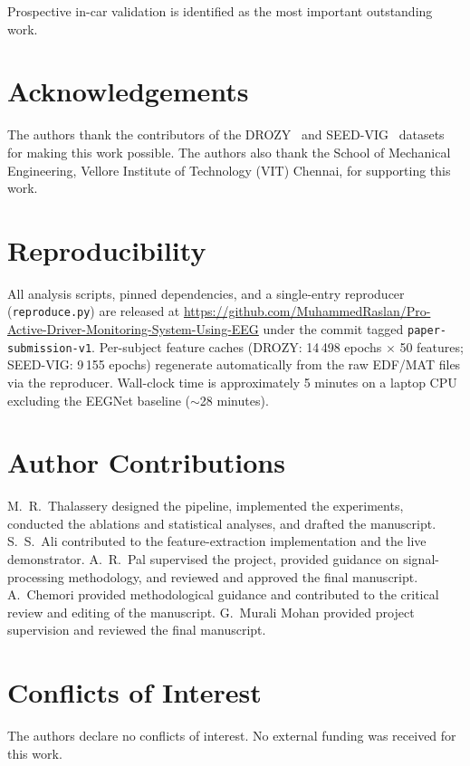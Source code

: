\documentclass[journal]{IEEEtran}
\DeclareRobustCommand{\add}[1]{#1}                         %
\DeclareRobustCommand{\add}[1]{\hl{#1}}
\begin{document}
Prospective in-car validation is identified as the most important outstanding work.

\section*{Acknowledgements}
The authors thank the contributors of the DROZY~\cite{drozy2016} and SEED-VIG~\cite{zheng2017seedvig} datasets for making this work possible. \add{The authors also thank the School of Mechanical Engineering, Vellore Institute of Technology (VIT) Chennai, for supporting this work.}

\section*{Reproducibility}
All analysis scripts, pinned dependencies, and a single-entry reproducer (\texttt{reproduce.py}) are released at \url{https://github.com/MuhammedRaslan/Pro-Active-Driver-Monitoring-System-Using-EEG} under the commit tagged \texttt{paper-submission-v1}. Per-subject feature caches (DROZY: 14\,498 epochs \(\times\) 50 features; SEED-VIG: 9\,155 epochs) regenerate automatically from the raw EDF/MAT files via the reproducer. Wall-clock time is approximately 5 minutes on a laptop CPU excluding the EEGNet baseline (\(\sim\)28 minutes).

\section*{Author Contributions}
M.~R.~Thalassery designed the pipeline, implemented the experiments, conducted the ablations and statistical analyses, and drafted the manuscript. S.~S.~Ali contributed to the feature-extraction implementation and the live demonstrator. A.~R.~Pal supervised the project, provided guidance on signal-processing methodology, and reviewed and approved the final manuscript. \add{A.~Chemori provided methodological guidance and contributed to the critical review and editing of the manuscript.} G.~Murali Mohan provided project supervision and reviewed the final manuscript.

\section*{Conflicts of Interest}
The authors declare no conflicts of interest. No external funding was received for this work.



\end{document}
